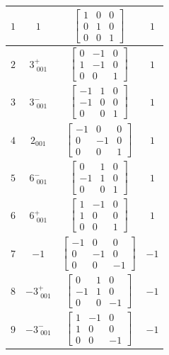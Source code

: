 \documentclass[fleqn,8pt]{jsarticle}
\begin{document}
\begin{longtable}{cccc}
$ 1 $ & $ 1 $ & $ \begin{bmatrix} 1 & 0 & 0 \\ 0 & 1 & 0 \\ 0 & 0 & 1 \end{bmatrix} $ & $ 1 $ \\ \hline
$ 2 $ & $ 3^{+}_{\,\,001} $ & $ \begin{bmatrix} 0 & -1 & 0 \\ 1 & -1 & 0 \\ 0 & 0 & 1 \end{bmatrix} $ & $ 1 $ \\ \hline
$ 3 $ & $ 3^{-}_{\,\,001} $ & $ \begin{bmatrix} -1 & 1 & 0 \\ -1 & 0 & 0 \\ 0 & 0 & 1 \end{bmatrix} $ & $ 1 $ \\ \hline
$ 4 $ & $ 2{}_{001} $ & $ \begin{bmatrix} -1 & 0 & 0 \\ 0 & -1 & 0 \\ 0 & 0 & 1 \end{bmatrix} $ & $ 1 $ \\ \hline
$ 5 $ & $ 6^{-}_{\,\,001} $ & $ \begin{bmatrix} 0 & 1 & 0 \\ -1 & 1 & 0 \\ 0 & 0 & 1 \end{bmatrix} $ & $ 1 $ \\ \hline
$ 6 $ & $ 6^{+}_{\,\,001} $ & $ \begin{bmatrix} 1 & -1 & 0 \\ 1 & 0 & 0 \\ 0 & 0 & 1 \end{bmatrix} $ & $ 1 $ \\ \hline
$ 7 $ & $ -1 $ & $ \begin{bmatrix} -1 & 0 & 0 \\ 0 & -1 & 0 \\ 0 & 0 & -1 \end{bmatrix} $ & $ -1 $ \\ \hline
$ 8 $ & $ -3^{+}_{\,\,001} $ & $ \begin{bmatrix} 0 & 1 & 0 \\ -1 & 1 & 0 \\ 0 & 0 & -1 \end{bmatrix} $ & $ -1 $ \\ \hline
$ 9 $ & $ -3^{-}_{\,\,001} $ & $ \begin{bmatrix} 1 & -1 & 0 \\ 1 & 0 & 0 \\ 0 & 0 & -1 \end{bmatrix} $ & $ -1 $ \\ \hline

\end{longtable}
\end{document}
